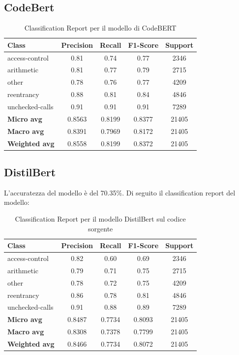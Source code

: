 \documentclass[../../Thesis.tex]{subfiles}
\begin{document}
\subsection{CodeBert}
\begin{table}[H]
    \centering
    \small
    \begin{tabular}{lcccc}
    \hline
    \textbf{Class} & \textbf{Precision} & \textbf{Recall} & \textbf{F1-Score} & \textbf{Support} \\
    \hline
    access-control & 0.81 & 0.74 & 0.77 & 2346 \\
    arithmetic & 0.81 & 0.77 & 0.79 & 2715 \\
    other & 0.78 & 0.76 & 0.77 & 4209 \\
    reentrancy & 0.88 & 0.81 & 0.84 & 4846 \\
    unchecked-calls & 0.91 & 0.91 & 0.91 & 7289 \\
    \hline
    \textbf{Micro avg} & 0.8563 & 0.8199 & 0.8377 & 21405 \\
    \textbf{Macro avg} & 0.8391 & 0.7969 & 0.8172 & 21405 \\
    \textbf{Weighted avg} & 0.8558 & 0.8199 & 0.8372 & 21405 \\
    \hline
    \end{tabular}
    \caption{Classification Report per il modello di CodeBERT}
    \end{table}
\subsection{DistilBert}
L'accuratezza del modello \`e del 70.35\%. Di seguito il classification report del modello:

\begin{table}[H]
    \centering
    \small
    \begin{tabular}{lcccc}
    \hline
    \textbf{Class} & \textbf{Precision} & \textbf{Recall} & \textbf{F1-Score} & \textbf{Support} \\
    \hline
    access-control & 0.82 & 0.60 & 0.69 & 2346 \\
    arithmetic & 0.79 & 0.71 & 0.75 & 2715 \\
    other & 0.78 & 0.72 & 0.75 & 4209 \\
    reentrancy & 0.86 & 0.78 & 0.81 & 4846 \\
    unchecked-calls & 0.91 & 0.88 & 0.89 & 7289 \\
    \hline
    \textbf{Micro avg} & 0.8487 & 0.7734 & 0.8093 & 21405 \\
    \textbf{Macro avg} & 0.8308 & 0.7378 & 0.7799 & 21405 \\
    \textbf{Weighted avg} & 0.8466 & 0.7734 & 0.8072 & 21405 \\
    \hline
    \end{tabular}
    \caption{Classification Report per il modello DistilBert sul codice sorgente}
\end{table}
\end{document}
